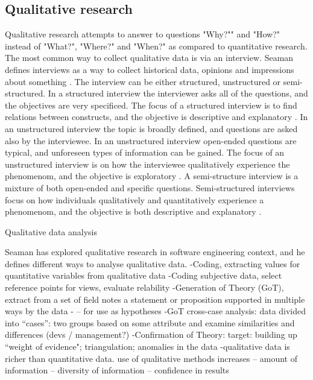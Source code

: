 \documentclass[english]{tktltiki2}
\theoremstyle{definition}
\theoremstyle{remark}
\begin{document}
\subsection{Qualitative research}
Qualitative research attempts to answer to questions "Why?"" and "How?" instead of "What?", "Where?" and "When?" as compared to quantitative research. The most common way to collect qualitative data is via an interview. Seaman defines interviews as a way to collect historical data, opinions and impressions about something \cite{seaman1999qualitative}. The interview can be either structured, unstructured or semi-structured. In a structured interview the interviewer asks all of the questions, and the objectives are very specificed. The focus of a structured interview is to find relations between constructs, and the objective is descriptive and explanatory \cite{runeson2009guidelines}. In an unstructured interview the topic is broadly defined, and questions are asked also by the interviewee. In an unstructured interview open-ended questions are typical, and unforeseen types of information can be gained. The focus of an unstructured interview is on how the interviewee qualitatively experience the phenomenom, and the objective is exploratory \cite{runeson2009guidelines}. A semi-structure interview is a mixture of both open-ended and specific questions. Semi-structured interviews focus on how individuals qualitatively and quantitatively experience a phenomenom, and the objective is both descriptive and explanatory \cite{runeson2009guidelines}.

Qualitative data analysis \cite{robson2002real}

Seaman has explored qualitative research in software engineering context, and he defines different ways to analyse qualitative data. \cite{seaman1999qualitative} 
-Coding, extracting values for quantitative variables from qualitative data
-Coding subjective data, select reference points for views, evaluate relability
-Generation of Theory (GoT), extract from a set of field notes a statement or proposition supported in multiple ways by the data - – for use as hypotheses
-GoT cross-case analysis: data divided into “cases”: two groups based on some attribute and examine similarities and differences (devs / management?)
-Confirmation of Theory: target: building up “weight of evidence"; triangulation; anomalies in the data
-qualitative data is richer than quantitative data. use of qualitative methods increases
– amount of information
– diversity of information
– confidence in results
\end{document}
